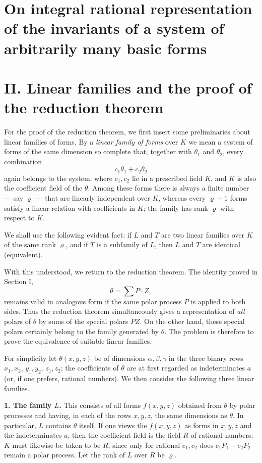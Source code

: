 \documentclass[11pt]{article}
\begin{document}
\section*{On integral rational representation of the invariants of a system of arbitrarily many basic forms}

\section*{II. Linear families and the proof of the reduction theorem}

For the proof of the reduction theorem, we first insert some preliminaries about linear families of forms. By a \emph{linear family of forms} over \(K\) we mean a system of forms of the same dimension so complete that, together with \(\theta_1\) and \(\theta_2\), every combination
\[
c_1\theta_1+c_2\theta_2
\]
again belongs to the system, where \(c_1,c_2\) lie in a prescribed field \(K\), and \(K\) is also the coefficient field of the \(\theta\). Among these forms there is always a finite number --- say \(\varrho\) --- that are linearly independent over \(K\), whereas every \(\varrho+1\) forms satisfy a linear relation with coefficients in \(K\); the family has rank \(\varrho\) with respect to \(K\).

We shall use the following evident fact: if \(L\) and \(T\) are two linear families over \(K\) of the same rank \(\varrho\), and if \(T\) is a subfamily of \(L\), then \(L\) and \(T\) are identical (equivalent).

With this understood, we return to the reduction theorem. The identity proved in Section I,
\[
\theta=\sum P\cdot Z,
\tag{1}
\]
remains valid in analogous form if the same polar process \(P\) is applied to both sides. Thus the reduction theorem simultaneously gives a representation of \emph{all} polars of \(\theta\) by sums of the special polars \(PZ\). On the other hand, these special polars certainly belong to the family generated by \(\theta\). The problem is therefore to prove the equivalence of suitable linear families.

For simplicity let \(\theta(x,y,z)\) be of dimensions \(\alpha,\beta,\gamma\) in the three binary rows \(x_1,x_2\), \(y_1,y_2\), \(z_1,z_2\); the coefficients of \(\theta\) are at first regarded as indeterminates \(a\) (or, if one prefers, rational numbers). We then consider the following three linear families.

\medskip
\noindent\textbf{1. The family \(L\).}
This consists of all forms \(f(x,y,z)\) obtained from \(\theta\) by polar processes and having, in each of the rows \(x,y,z\), the same dimensions as \(\theta\). In particular, \(L\) contains \(\theta\) itself. If one views the \(f(x,y,z)\) as forms in \(x,y,z\) and the indeterminates \(a\), then the coefficient field is the field \(R\) of rational numbers; \(K\) must likewise be taken to be \(R\), since only for rational \(c_1,c_2\) does \(c_1P_1+c_2P_2\) remain a polar process. Let the rank of \(L\) over \(R\) be \(\varrho\).
\end{document}
